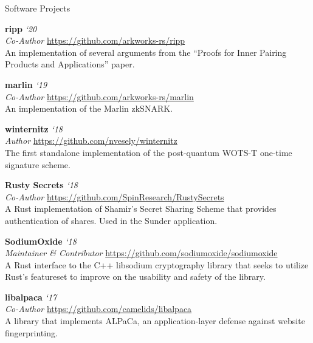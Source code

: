 \documentclass{cv}
\begin{document}
\begin{rSection}{Software Projects}

\textbf{ripp} \hfill \emph{`20} \\
\emph{Co-Author} \hfill \url{https://github.com/arkworks-rs/ripp} \\
{\small An implementation of several arguments from the ``Proofs for Inner Pairing Products and Applications'' paper.}

\textbf{marlin} \hfill \emph{`19} \\
\emph{Co-Author} \hfill \url{https://github.com/arkworks-rs/marlin} \\
{\small An implementation of the Marlin zkSNARK.}

\textbf{winternitz} \hfill \emph{`18} \\
\emph{Author} \hfill \url{https://github.com/nvesely/winternitz} \\
{\small The first standalone implementation of the post-quantum WOTS-T one-time signature scheme.}

\textbf{Rusty Secrets} \hfill \emph{`18} \\
\emph{Co-Author} \hfill \url{https://github.com/SpinResearch/RustySecrets} \\
{\small A Rust implementation of Shamir's Secret Sharing Scheme that provides authentication of shares. Used in the Sunder application.}

\textbf{SodiumOxide} \hfill \emph{`18} \\
\emph{Maintainer \& Contributor} \hfill \url{https://github.com/sodiumoxide/sodiumoxide} \\
{\small A Rust interface to the C++ libsodium cryptography library that seeks to utilize Rust's featureset to improve on the usability and safety of the library.}

\textbf{libalpaca} \hfill \emph{`17} \\
\emph{Co-Author} \hfill \url{https://github.com/camelids/libalpaca}\\
{\small A library that implements ALPaCa, an application-layer defense against website fingerprinting.}

\end{rSection}


\end{document}
